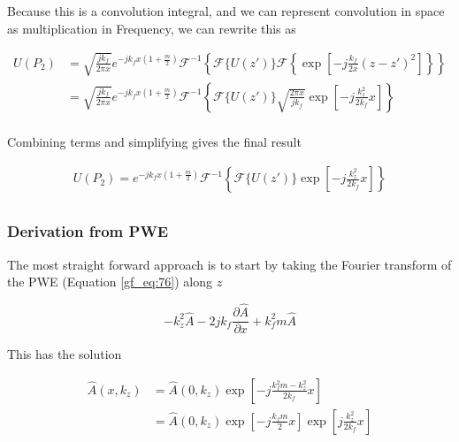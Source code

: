 Because this is a convolution integral, and we can represent convolution in space as multiplication in Frequency, we can rewrite this as

\begin{equation}
\begin{aligned}
U(P_2) &=\sqrt{\frac{jk_f}{2\pi x}}e^{-jk_fx\left(1+\frac{m}{2}\right)}\mathcal{F}^{-1}\left\{\mathcal{F}\{U(z')\}\mathcal{F}\left\{ \exp\left[-j \frac{k_f}{2x}\left(z-z'\right)^2 \right]\right\} \right\} \\
&=\sqrt{\frac{jk_f}{2\pi x}}e^{-jk_fx\left(1+\frac{m}{2}\right)}\mathcal{F}^{-1}\left\{\mathcal{F}\{U(z')\}\sqrt{\frac{2\pi x}{jk_f}}\exp\left[-j\frac{k_z^2}{2k_f}x \right] \right\} \\
\label{gf_eq:302}
\end{aligned}
\end{equation}
\renewcommand{\baselinestretch}{2} \small\normalsize

\noindent Combining terms and simplifying gives the final result

\begin{equation}
\begin{aligned}
U(P_2) = e^{-jk_fx\left(1+\frac{m}{2}\right)}\mathcal{F}^{-1}\left\{\mathcal{F}\{U(z')\}\exp\left[-j\frac{k_z^2}{2k_f}x \right] \right\} \\
\label{gf_eq:303}
\end{aligned}
\end{equation}
\renewcommand{\baselinestretch}{2} \small\normalsize


\subsubsection{Derivation from PWE}
\noindent The most straight forward approach is to start by taking the Fourier transform of the PWE (Equation \ref{gf_eq:76}) along $z$

\begin{equation}
-k_z^2\hat{A} -2jk_f\frac{\partial \hat{A}}{\partial x} +k_f^2m\hat{A}
\label{gf_eq:77}
\end{equation}
\renewcommand{\baselinestretch}{2} \small\normalsize

\noindent This has the solution

\begin{equation}
\begin{aligned}
\hat{A}(x,k_z) &= \hat{A}(0,k_z)\exp\left[-j\frac{k_f^2m-k_z^2}{2k_f}x \right] \\
&= \hat{A}(0,k_z)\exp\left[-j\frac{k_fm}{2}x\right]\exp\left[j\frac{k_z^2}{2k_f}x \right]
\end{aligned}
\label{gf_eq:78}
\end{equation}
\renewcommand{\baselinestretch}{2} \small\normalsize

